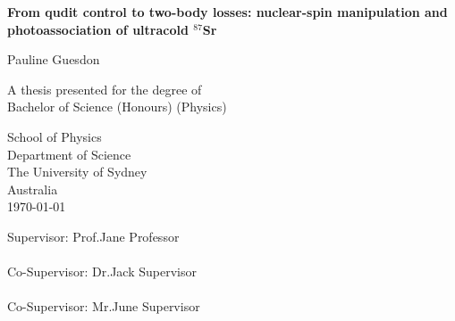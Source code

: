 \begin{titlepage}
    \begin{center}
        \vspace*{1cm}
        
        \Huge
        \textbf{From qudit control to two-body losses: nuclear-spin manipulation and photoassociation of ultracold $^{87}$Sr}
        
        \vspace{1.5cm}
        
        Pauline Guesdon
        
        \vfill

        \large
        A thesis presented for the degree of\\
        Bachelor of Science (Honours) (Physics)
        
        \vspace{0.8cm}
        
        
        \large
        School of Physics\\
        Department of Science\\
        The University of Sydney\\
        Australia\\
        \today

        \vfill

        {\Large Supervisor: Prof.\;Jane Professor} \\ \, \\
        {\large Co-Supervisor: Dr.\;Jack Supervisor} \\ \, \\
        {\large Co-Supervisor: Mr.\;June Supervisor}
        
    \end{center}
\end{titlepage}
